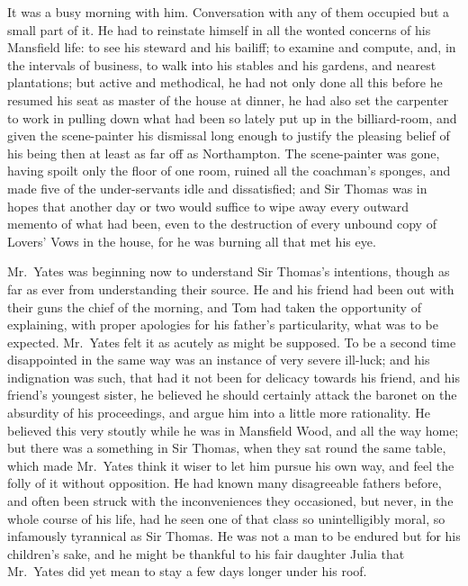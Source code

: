 It was a busy morning with him.  Conversation with any
of them occupied but a small part of it.  He had to
reinstate himself in all the wonted concerns of his
Mansfield life:  to see his steward and his bailiff;
to examine and compute, and, in the intervals
of business, to walk into his stables and his gardens,
and nearest plantations; but active and methodical,
he had not only done all this before he resumed his seat
as master of the house at dinner, he had also set the
carpenter to work in pulling down what had been so lately
put up in the billiard-room, and given the scene-painter
his dismissal long enough to justify the pleasing belief
of his being then at least as far off as Northampton.
The scene-painter was gone, having spoilt only the
floor of one room, ruined all the coachman's sponges,
and made five of the under-servants idle and dissatisfied;
and Sir Thomas was in hopes that another day or two would
suffice to wipe away every outward memento of what had been,
even to the destruction of every unbound copy of Lovers'
Vows in the house, for he was burning all that met his eye.

Mr.\ Yates was beginning now to understand Sir Thomas's intentions,
though as far as ever from understanding their source.
He and his friend had been out with their guns the chief of
the morning, and Tom had taken the opportunity of explaining,
with proper apologies for his father's particularity,
what was to be expected.  Mr.\ Yates felt it as acutely
as might be supposed.  To be a second time disappointed
in the same way was an instance of very severe ill-luck;
and his indignation was such, that had it not been for delicacy
towards his friend, and his friend's youngest sister,
he believed he should certainly attack the baronet on
the absurdity of his proceedings, and argue him into a
little more rationality.  He believed this very stoutly
while he was in Mansfield Wood, and all the way home;
but there was a something in Sir Thomas, when they sat
round the same table, which made Mr.\ Yates think it wiser
to let him pursue his own way, and feel the folly of it
without opposition.  He had known many disagreeable
fathers before, and often been struck with the inconveniences
they occasioned, but never, in the whole course of his life,
had he seen one of that class so unintelligibly moral,
so infamously tyrannical as Sir Thomas.  He was not a man
to be endured but for his children's sake, and he might
be thankful to his fair daughter Julia that Mr.\ Yates
did yet mean to stay a few days longer under his roof.

